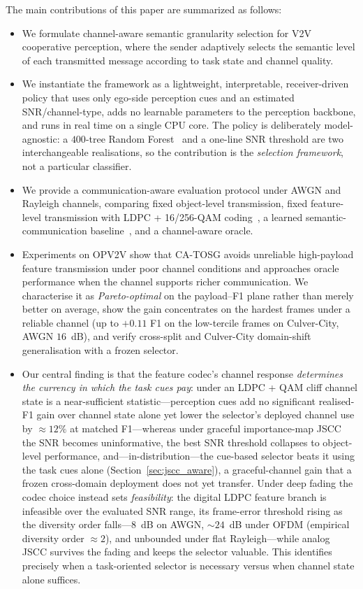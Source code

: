 \documentclass[journal]{IEEEtran}
\newcommand{\method}{CA-TOSG}
\begin{document}
The main contributions of this paper are summarized as follows:
\begin{itemize}
    \item We formulate channel-aware semantic granularity selection for V2V cooperative perception, where the sender adaptively selects the semantic level of each transmitted message according to task state and channel quality.
    \item We instantiate the framework as a lightweight, interpretable, receiver-driven policy that uses only ego-side perception cues and an estimated SNR/channel-type, adds no learnable parameters to the perception backbone, and runs in real time on a single CPU core. The policy is deliberately model-agnostic: a $400$-tree Random Forest~\cite{breiman2001random} and a one-line SNR threshold are two interchangeable realisations, so the contribution is the \emph{selection framework}, not a particular classifier.
    \item We provide a communication-aware evaluation protocol under AWGN and Rayleigh channels, comparing fixed object-level transmission, fixed feature-level transmission with LDPC + 16/256-QAM coding~\cite{ieee80211bd}, a learned semantic-communication baseline~\cite{sheng2024importance}, and a channel-aware oracle.
    \item Experiments on OPV2V show that \method{} avoids unreliable high-payload feature transmission under poor channel conditions and approaches oracle performance when the channel supports richer communication. We characterise it as \emph{Pareto-optimal} on the payload--F1 plane rather than merely better on average, show the gain concentrates on the hardest frames under a reliable channel (up to $+0.11$ F1 on the low-tercile frames on Culver-City, AWGN $16$~dB), and verify cross-split and Culver-City domain-shift generalisation with a frozen selector.
    \item Our central finding is that the feature codec's channel response \emph{determines the currency in which the task cues pay}: under an LDPC + QAM cliff channel state is a near-sufficient statistic---perception cues add no significant realised-F1 gain over channel state alone yet lower the selector's deployed channel use by ${\approx}12\%$ at matched F1---whereas under graceful importance-map JSCC the SNR becomes uninformative, the best SNR threshold collapses to object-level performance, and---in-distribution---the cue-based selector beats it using the task cues alone (Section~\ref{sec:jscc_aware}), a graceful-channel gain that a frozen cross-domain deployment does not yet transfer. Under deep fading the codec choice instead sets \emph{feasibility}: the digital LDPC feature branch is infeasible over the evaluated SNR range, its frame-error threshold rising as the diversity order falls---$8$~dB on AWGN, ${\sim}24$~dB under OFDM (empirical diversity order ${\approx}2$), and unbounded under flat Rayleigh---while analog JSCC survives the fading and keeps the selector valuable. This identifies precisely when a task-oriented selector is necessary versus when channel state alone suffices.
\end{itemize}
\end{document}
